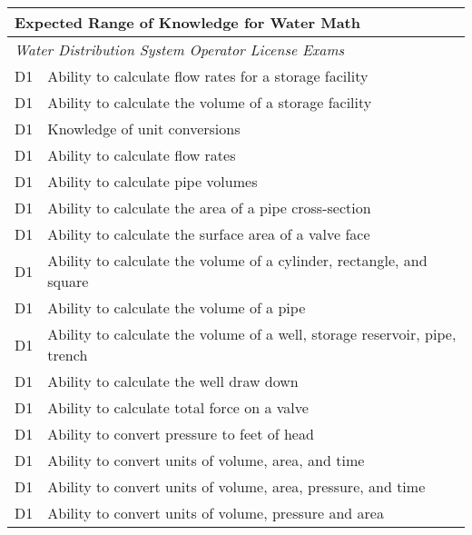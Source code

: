 \begin{table}[H]
\begin{tabular}{| m{1cm} | m{15cm} |}
\hline
\multicolumn{2}{|l|}{\textbf{Expected   Range of Knowledge for Water Math}}                                                                          \\ \hline
\multicolumn{2}{|l|}{\textit{Water   Distribution System Operator License Exams}}                                                                                      \\ \hline
D1 & Ability to   calculate flow rates for a storage facility                     \\ \hline
D1 & Ability to calculate   the volume of a storage facility                      \\ \hline
D1 & Knowledge of unit   conversions                                              \\ \hline
D1 & Ability to calculate   flow rates                                            \\ \hline
D1 & Ability to calculate   pipe volumes                                          \\ \hline
D1 & Ability to calculate   the area of a pipe cross-section                      \\ \hline
D1 & Ability to calculate   the surface area of a valve face                      \\ \hline
D1 & Ability to calculate   the volume of a cylinder, rectangle, and square       \\ \hline
D1 & Ability to calculate   the volume of a pipe                                  \\ \hline
D1 & Ability to calculate   the volume of a well, storage reservoir, pipe, trench \\ \hline
D1 & Ability to calculate   the well draw down                                    \\ \hline
D1 & Ability to calculate   total force on a valve                                \\ \hline
D1 & Ability to convert   pressure to feet of head                                \\ \hline
D1 & Ability to convert   units of volume, area, and time                         \\ \hline
D1 & Ability to convert   units of volume, area, pressure, and time               \\ \hline
D1 & Ability to convert   units of volume, pressure and area                      \\ \hline

\end{tabular}
\end{table}
